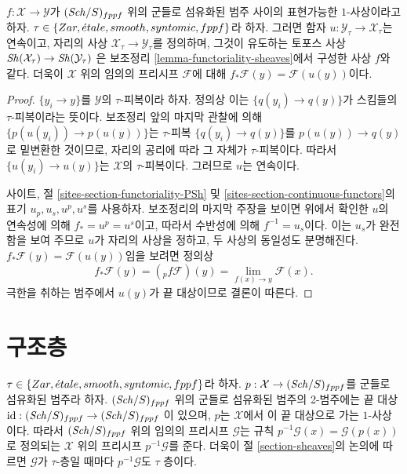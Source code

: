 \begin{lemma}
\label{lemma-representable-pushforward}
$f : \mathcal{X} \to \mathcal{Y}$가 $(\mathit{Sch}/S)_{fppf}$ 위의 군들로
섬유화된 범주 사이의 표현가능한 $1$-사상이라고 하자.
$\tau \in \{Zar, {\acute{e}tale}, smooth, syntomic, fppf\}$라 하자.
그러면 함자 $u : \mathcal{Y}_\tau \to \mathcal{X}_\tau$는 연속이고,
자리의 사상 $\mathcal{X}_\tau \to \mathcal{Y}_\tau$를 정의하며,
그것이 유도하는 토포스 사상
$\mathop{\mathit{Sh}}\nolimits(\mathcal{X}_\tau) \to \mathop{\mathit{Sh}}\nolimits(\mathcal{Y}_\tau)$
은 보조정리 \ref{lemma-functoriality-sheaves}에서 구성한 사상 $f$와 같다.
더욱이 $\mathcal{X}$ 위의 임의의 프리시프 $\mathcal{F}$에 대해
$f_*\mathcal{F}(y) = \mathcal{F}(u(y))$이다.
\end{lemma}

\begin{proof}
$\{y_i \to y\}$를 $\mathcal{Y}$의 $\tau$-피복이라 하자. 정의상 이는
$\{q(y_i) \to q(y)\}$가 스킴들의 $\tau$-피복이라는 뜻이다.
보조정리 앞의 마지막 관찰에 의해
$\{p(u(y_i)) \to p(u(y))\}$는 $\tau$-피복
$\{q(y_i) \to q(y)\}$를 $p(u(y)) \to q(y)$로 밑변환한 것이므로,
자리의 공리에 따라 그 자체가 $\tau$-피복이다. 따라서
$\{u(y_i) \to u(y)\}$는 $\mathcal{X}$의 $\tau$-피복이다.
그러므로 $u$는 연속이다.

\medskip\noindent
사이트, 절 \ref{sites-section-functoriality-PSh} 및
\ref{sites-section-continuous-functors}의 표기
$u_p, u_s, u^p, u^s$를 사용하자.
보조정리의 마지막 주장을 보이면 위에서 확인한 $u$의 연속성에 의해
$f_* = u^p = u^s$이고, 따라서 수반성에 의해 $f^{-1} = u_s$이다.
이는 $u_s$가 완전함을 보여 주므로 $u$가 자리의 사상을 정하고,
두 사상의 동일성도 분명해진다.
$f_*\mathcal{F}(y) = \mathcal{F}(u(y))$임을 보려면 정의상
$$
f_*\mathcal{F}(y) = ({}_pf\mathcal{F})(y) =
\lim_{f(x) \to y} \mathcal{F}(x).
$$
극한을 취하는 범주에서 $u(y)$가 끝 대상이므로 결론이 따른다.
\end{proof}





\section{구조층}
\label{section-structure-sheaf}

\noindent
$\tau \in \{Zar, {\acute{e}tale}, smooth, syntomic, fppf\}$라 하자.
$p : \mathcal{X} \to (\mathit{Sch}/S)_{fppf}$를 군들로 섬유화된 범주라 하자.
$(\mathit{Sch}/S)_{fppf}$ 위의 군들로 섬유화된 범주의 2-범주에는 끝 대상
$\text{id} : (\mathit{Sch}/S)_{fppf} \to (\mathit{Sch}/S)_{fppf}$
이 있으며, $p$는 $\mathcal{X}$에서 이 끝 대상으로 가는 $1$-사상이다.
따라서 $(\mathit{Sch}/S)_{fppf}$ 위의 임의의 프리시프 $\mathcal{G}$는
규칙 $p^{-1}\mathcal{G}(x) = \mathcal{G}(p(x))$로 정의되는
$\mathcal{X}$ 위의 프리시프 $p^{-1}\mathcal{G}$를 준다. 더욱이
절 \ref{section-sheaves}의 논의에 따르면 $\mathcal{G}$가
$\tau$-층일 때마다 $p^{-1}\mathcal{G}$도 $\tau$ 층이다.

